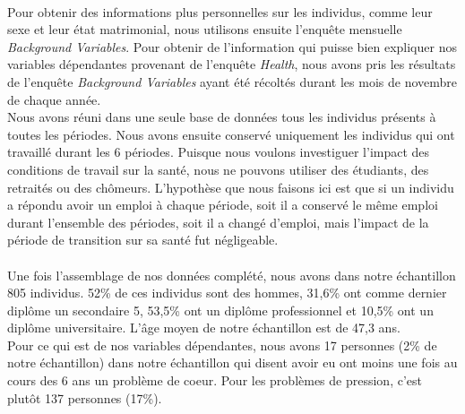 \documentclass[a4paper, oneside, titlepage]{article}
\begin{document}
\\
Pour obtenir des informations plus personnelles sur les individus, comme leur sexe et leur état matrimonial, nous utilisons ensuite l'enquête mensuelle \textit{Background Variables}. Pour obtenir de l'information qui puisse bien expliquer nos variables dépendantes provenant de l'enquête \textit{Health}, nous avons pris les résultats de l'enquête \textit{Background Variables} ayant été récoltés durant les mois de novembre de chaque année.
\\
Nous avons réuni dans une seule base de données tous les individus présents à toutes les périodes. Nous avons ensuite conservé uniquement les individus qui ont travaillé durant les 6 périodes. Puisque nous voulons investiguer l'impact des conditions de travail sur la santé, nous ne pouvons utiliser des étudiants, des retraités ou des chômeurs. L'hypothèse que nous faisons ici est que si un individu a répondu avoir un emploi à chaque période, soit il a conservé le même emploi durant l'ensemble des périodes, soit il a changé d'emploi, mais l'impact de la période de transition sur sa santé fut négligeable.
\\
\\
Une fois l'assemblage de nos données complété, nous avons dans notre échantillon 805 individus. 52\% de ces individus sont des hommes, 31,6\% ont comme dernier diplôme un secondaire 5, 53,5\% ont un diplôme professionnel et 10,5\% ont un diplôme universitaire. L'âge moyen de notre échantillon est de 47,3 ans.
\\
Pour ce qui est de nos variables dépendantes, nous avons 17 personnes (2\% de notre échantillon) dans notre échantillon qui disent avoir eu ont moins une fois au cours des 6 ans un problème de coeur. Pour les problèmes de pression, c'est plutôt 137 personnes (17\%).
\end{document}
